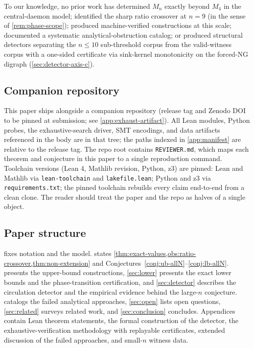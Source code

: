 \documentclass[11pt,a4paper]{article}
\theoremstyle{plain}
\theoremstyle{definition}
\newcommand{\Mn}{M_n}
\begin{document}
To our knowledge, no prior work has determined $\Mn$ exactly beyond
$M_4$ in the central-daemon model; identified the sharp ratio
crossover at $n = 9$ (in the sense of \cref{rem:phase-scope});
produced machine-verified constructions at this scale; documented
a systematic analytical-obstruction catalog; or produced structural
detectors separating the $n \le 10$ sub-threshold corpus from the
valid-witness corpus with a one-sided certificate via sink-kernel
monotonicity on the forced-NG digraph
(\cref{sec:detector-axis-c}).

\subsection{Companion repository}\label{sec:intro-repo}

This paper ships alongside a companion repository (release tag and
Zenodo DOI to be pinned at submission; see
\cref{app:exhaust-artifact}).  All Lean modules, Python probes,
the exhaustive-search driver, SMT encodings, and data artifacts
referenced in the body are in that tree; the paths indexed in
\cref{app:manifest} are relative to the release tag.  The repo
root contains \texttt{REVIEWER.md}, which maps each theorem and
conjecture in this paper to a single reproduction command.
Toolchain versions (Lean 4, Mathlib revision, Python, z3) are
pinned: Lean and Mathlib via \texttt{lean-toolchain} and
\texttt{lakefile.lean}; Python and z3 via \texttt{requirements.txt};
the pinned toolchain rebuilds every claim end-to-end from a clean
clone.  The reader should treat the paper and the repo as halves
of a single object.

\subsection{Paper structure}\label{sec:intro-structure}

 fixes notation and the model.   states
\cref{thm:exact-values,obs:ratio-crossover,thm:non-extension} and
Conjectures~\ref{conj:ub-allN}--\ref{conj:lb-allN}.
 presents the upper-bound constructions, \cref{sec:lower}
presents the exact lower bounds and the phase-transition certification,
and \cref{sec:detector} describes the circulation detector and the
empirical evidence behind the large-$n$ conjecture.
 catalogs the failed analytical approaches,
\cref{sec:open} lists open questions, \cref{sec:related} surveys
related work, and \cref{sec:conclusion} concludes.  Appendices contain
Lean theorem statements, the formal construction of the detector,
the exhaustive-verification methodology with replayable certificates,
extended discussion of the failed approaches, and small-$n$ witness data.
\end{document}

